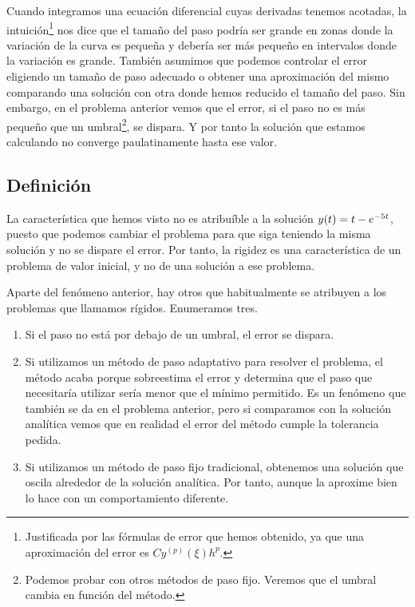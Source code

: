 Cuando integramos una ecuación diferencial cuyas derivadas tenemos acotadas,
la intuición\footnote{
    Justificada por las fórmulas de error que hemos obtenido,
    ya que una aproximación del error es $Cy^{(p)}(\xi)h^p$.
}
nos dice que el tamaño del paso
podría ser grande en zonas donde la variación de la curva es pequeña
y debería ser más pequeño en intervalos donde la variación es grande.
También asumimos que podemos controlar el error
eligiendo un tamaño de paso adecuado o
obtener una aproximación del mismo
comparando una solución con otra donde hemos reducido el tamaño del paso.
Sin embargo, en el problema anterior vemos que el error,
si el paso no es más pequeño que un umbral\footnote{
    Podemos probar con otros métodos de paso fijo.
    Veremos que el umbral cambia en función del método.
},
se dispara.
Y por tanto la solución que estamos calculando
no converge paulatinamente hasta ese valor.

\subsection{Definición}

La característica que hemos visto no es atribuíble a la solución
$y(t) = t - e^{-5t}$,
puesto que podemos cambiar el problema para que siga teniendo la misma solución
y no se dispare el error.
Por tanto, la rigidez es una característica de un problema de valor inicial,
y no de una solución a ese problema.

Aparte del fenómeno anterior,
hay otros que habitualmente se atribuyen a los problemas que llamamos rígidos.
Enumeramos tres.
%
\begin{enumerate}
    \item Si el paso no está por debajo de un umbral,
    el error se dispara.
    \item Si utilizamos un método de paso adaptativo para resolver el problema,
    el método acaba porque sobreestima el error y determina que
    el paso que necesitaría utilizar sería menor que el mínimo permitido.
    Es un fenómeno que también se da en el problema anterior,
    pero si comparamos con la solución analítica vemos que en realidad
    el error del método cumple la tolerancia pedida.
    \item Si utilizamos un método de paso fijo tradicional,
    obtenemos una solución que oscila alrededor de la solución analítica.
    Por tanto, aunque la aproxime bien lo hace con un comportamiento diferente.
\end{enumerate}

